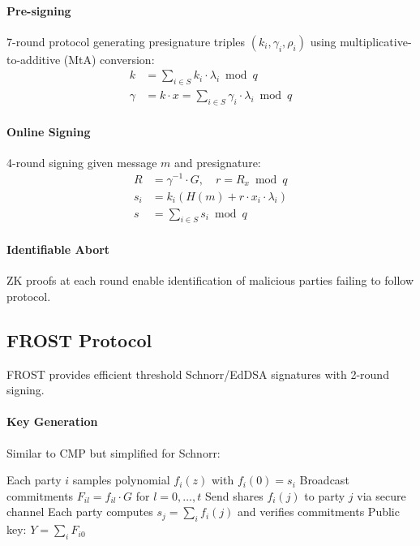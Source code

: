 \documentclass[11pt,twocolumn]{article}
\begin{document}
\paragraph{Pre-signing} 7-round protocol generating presignature triples $(k_i, \gamma_i, \rho_i)$ using multiplicative-to-additive (MtA) conversion:
\begin{align*}
k &= \sum_{i \in S} k_i \cdot \lambda_i \bmod q \\
\gamma &= k \cdot x = \sum_{i \in S} \gamma_i \cdot \lambda_i \bmod q
\end{align*}

\paragraph{Online Signing} 4-round signing given message $m$ and presignature:
\begin{align*}
R &= \gamma^{-1} \cdot G, \quad r = R_x \bmod q \\
s_i &= k_i (H(m) + r \cdot x_i \cdot \lambda_i) \\
s &= \sum_{i \in S} s_i \bmod q
\end{align*}

\paragraph{Identifiable Abort} ZK proofs at each round enable identification of malicious parties failing to follow protocol.

\subsection{FROST Protocol}

FROST \cite{komlo2020} provides efficient threshold Schnorr/EdDSA signatures with 2-round signing.

\paragraph{Key Generation} Similar to CMP but simplified for Schnorr:
\begin{algorithmic}[1]
\State Each party $i$ samples polynomial $f_i(z)$ with $f_i(0) = s_i$
\State Broadcast commitments $F_{il} = f_{il} \cdot G$ for $l = 0, \ldots, t$
\State Send shares $f_i(j)$ to party $j$ via secure channel
\State Each party computes $s_j = \sum_i f_i(j)$ and verifies commitments
\State Public key: $Y = \sum_i F_{i0}$
\end{algorithmic}
\end{document}
